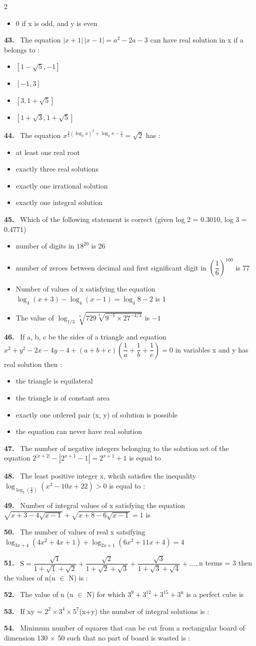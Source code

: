 \documentclass[10pt]{extarticle}
\newcommand{\qn}[1]{\par\smallskip\noindent\textbf{#1.}~}
\newenvironment{qoptions}{\begin{itemize}[leftmargin=1.8em,itemsep=1pt,topsep=2pt,label={}]}{\end{itemize}}
\newcommand{\opt}[2]{\item[(#1)] #2}
\begin{document}
\begin{multicols}{2}
\begin{qoptions}
\opt{D}{0 if x is odd, and y is even}
\end{qoptions}
\qn{43} The equation $|x+1|\,|x-1|=a^2-2a-3$ can have real solution in x if a belongs to :
\begin{qoptions}
\opt{A}{$[1-\sqrt5,-1]$}
\opt{B}{$[-1, 3]$}
\opt{C}{$[3, 1+\sqrt5]$}
\opt{D}{$[1+\sqrt3, 1+\sqrt5]$}
\end{qoptions}
\qn{44} The equation $x^{\frac34(\log_2x)^2+\log_2x-\frac54}=\sqrt2$ has :
\begin{qoptions}
\opt{A}{at least one real root}
\opt{B}{exactly three real solutions}
\opt{C}{exactly one irrational solution}
\opt{D}{exactly one integral solution}
\end{qoptions}
\qn{45} Which of the following statement is correct (given log 2 = 0.3010, log 3 = 0.4771)
\begin{qoptions}
\opt{A}{number of digits in $18^{20}$ is 26}
\opt{B}{number of zeroes between decimal and first significant digit in $\left(\dfrac16\right)^{100}$ is 77}
\opt{C}{Number of values of x satisfying the equation $\log_4(x+3)-\log_4(x-1)=\log_4 8-2$ is 1}
\opt{D}{The value of $\log_{1/3}\sqrt[4]{729\sqrt[3]{9^{-1}\times27^{-4/3}}}$ is $-1$}
\end{qoptions}
\qn{46} If a, b, c be the sides of a triangle and equation $x^2+y^2-2x-4y-4+(a+b+c)\left(\dfrac1a+\dfrac1b+\dfrac1c\right)=0$ in variables x and y has real solution then :
\begin{qoptions}
\opt{A}{the triangle is equilateral}
\opt{B}{the triangle is of constant area}
\opt{C}{exactly one ordered pair (x, y) of solution is possible}
\opt{D}{the equation can never have real solution}
\end{qoptions}
\qn{47} The number of negative integers belonging to the solution set of the equation $2^{|x+2|}-|2^{x+1}-1|=2^{x+1}+1$ is equal to
\qn{48} The least positive integer x, whcih satisfies the inequality $\log_{\log_2\left(\frac{\mathrm x}2\right)}(x^2-10x+22)>0$ is equal to :
\qn{49} Number of integral values of x satisfying the equation $\sqrt{x+3-4\sqrt{x-1}}+\sqrt{x+8-6\sqrt{x-1}}=1$ is
\qn{50} The number of values of real x satsifying $\log_{3x+4}(4x^2+4x+1)+\log_{2x+1}(6x^2+11x+4)=4$
\qn{51} $\mathrm S=\dfrac{\sqrt1}{1+\sqrt1+\sqrt2}+\dfrac{\sqrt2}{1+\sqrt2+\sqrt3}+\dfrac{\sqrt3}{1+\sqrt3+\sqrt4}+\dots..$n terms = 3 then the values of n(n $\in$ N) is :
\qn{52} The value of n (n $\in$ N) for which $3^9+3^{12}+3^{15}+3^\mathrm n$ is a perfect cube is \underline{\hspace{2cm}}
\qn{53} If xy = $2^2\times3^4\times5^7$(x+y) the number of integral solutions is \underline{\hspace{2cm}}:
\qn{54} Minimum number of squares that can be cut from a rectangular board of dimension 130 $\times$ 50 such that no part of board is wasted is :
\end{multicols}
\end{document}
